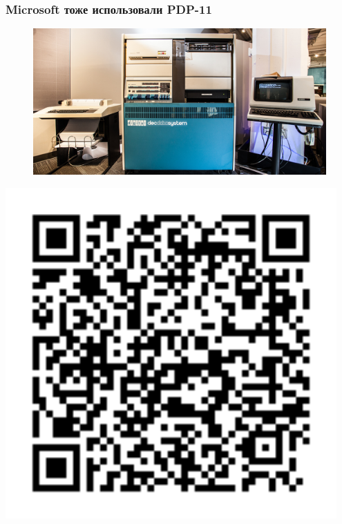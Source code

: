 \documentclass[t,aspectratio=169]{beamer}
\begin{document}
\begin{frame}
    \frametitle{Microsoft тоже использовали PDP-11}
    \begin{minipage}{0.8\textwidth}
        \begin{figure}
            \begin{centering}
                \includegraphics[height=0.7\textheight]{miss-piggy}
            \end{centering}
        \end{figure}
    \end{minipage}
    \begin{minipage}{0.19\textwidth}
        \includegraphics[width=0.95\textwidth]{miss-piggy-qr}
    \end{minipage}
\end{frame}
\end{document}
